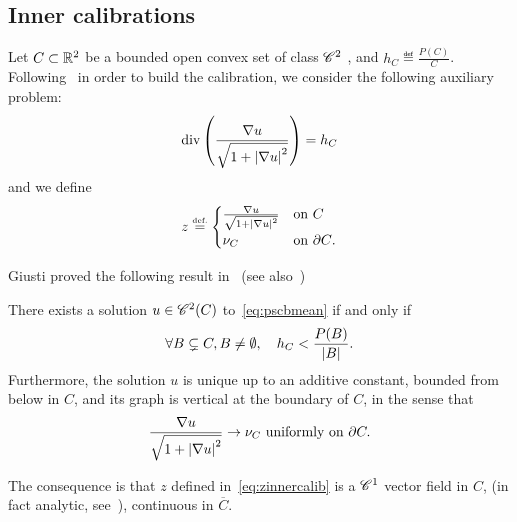 \subsection{Inner calibrations}
Let $C\subset \mathbb{R}^2$ be a bounded open convex set of class $\mathscr{C}^{2}$ 
, and $h_C \eqdef \frac{P(C)}{C}$.
Following~\cite{AmaBel15} in order to build the calibration, we consider the following auxiliary problem:
\begin{equation}
  \operatorname{div}\left(\frac{\nabla u}{\sqrt{1+\left| \nabla u \right|^2}}\right) = h_C \label{eq:pscbmean}
\end{equation}
and we define
\begin{equation}\label{eq:zinnercalib}
  z\stackrel{\mbox{\upshape\tiny def.}}{=}\begin{cases}
\frac{\nabla u}{\sqrt{1+\left| \nabla u \right|^2}} &\mbox{on $C$}\\
\nu_C & \mbox{on $\partial C$}.\end{cases}
\end{equation}

Giusti proved the following result in~\cite{giusti78} (see also~\cite[Prop.6.2]{AmaBel15})
\begin{thm}\label{thm:giustiexist} There exists a solution $u\in\mathscr{C}^{2}(C)$ to~\eqref{eq:pscbmean} if and only if 
  \begin{equation}
    \forall B\subsetneq C, B\neq \emptyset, \quad h_C < \frac{P(B)}{\left| B \right|}. \label{eq:uniqcheeg}
  \end{equation}
Furthermore, the solution $u$ is unique up to an additive constant, bounded from below in $C$, and its graph is vertical at the boundary of $C$, in the sense that 
  \begin{equation*}
    \frac{\nabla u}{\sqrt{1+\left| \nabla u \right|^2}} \to \nu_C \mbox{ uniformly on }\partial C.
  \end{equation*}
\end{thm}
The consequence is that $z$ defined in~\eqref{eq:zinnercalib} is a $\mathscr{C}^{1}$ vector field in $C$, (in fact analytic, see~\cite{AmaBel15}), continuous in $\overline{C}$.

